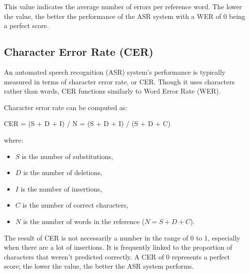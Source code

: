 \documentclass[conference]{IEEEtran}
\begin{document}
This value indicates the average number of errors per reference word. The lower the value, the better the performance of the ASR system with a WER of 0 being a perfect score. 

\subsection{Character Error Rate (CER)}

\quad \quad An automated speech recognition (ASR) system's performance is typically measured in terms of character error rate, or CER. Though it uses characters rather than words, CER functions similarly to Word Error Rate (WER).

Character error rate can be computed as:

CER = (S + D + I) / N = (S + D + I) / (S + D + C)

where:
\begin{itemize}
    \item \( S \) is the number of substitutions,
    \item \( D \) is the number of deletions,
    \item \( I \) is the number of insertions,
    \item \( C \) is the number of correct characters,
    \item \( N \) is the number of words in the reference (\( N=S+D+C \)). \cite{morris2004}
\end{itemize}

The result of CER is not necessarily a number in the range of 0 to 1, especially when there are a lot of insertions. It is frequently linked to the proportion of characters that weren't predicted correctly. A CER of 0 represents a perfect score; the lower the value, the better the ASR system performs.
\end{document}
